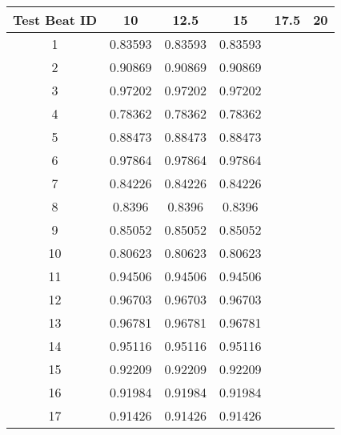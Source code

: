 \begin{tabular}{|c|c|c|c|c|c|}
\hline 
Test Beat ID & 10 & 12.5 & 15 & 17.5 & 20 \\ 
\hline 
1 & 0.83593 & 0.83593 & 0.83593 &  &  \\ 
2 & 0.90869 & 0.90869 & 0.90869 &  &  \\ 
3 & 0.97202 & 0.97202 & 0.97202 &  &  \\ 
4 & 0.78362 & 0.78362 & 0.78362 &  &  \\ 
5 & 0.88473 & 0.88473 & 0.88473 &  &  \\ 
6 & 0.97864 & 0.97864 & 0.97864 &  &  \\ 
7 & 0.84226 & 0.84226 & 0.84226 &  &  \\ 
8 & 0.8396 & 0.8396 & 0.8396 &  &  \\ 
9 & 0.85052 & 0.85052 & 0.85052 &  &  \\ 
10 & 0.80623 & 0.80623 & 0.80623 &  &  \\ 
11 & 0.94506 & 0.94506 & 0.94506 &  &  \\ 
12 & 0.96703 & 0.96703 & 0.96703 &  &  \\ 
13 & 0.96781 & 0.96781 & 0.96781 &  &  \\ 
14 & 0.95116 & 0.95116 & 0.95116 &  &  \\ 
15 & 0.92209 & 0.92209 & 0.92209 &  &  \\ 
16 & 0.91984 & 0.91984 & 0.91984 &  &  \\ 
17 & 0.91426 & 0.91426 & 0.91426 &  &  \\ 
\hline 
\end{tabular}
